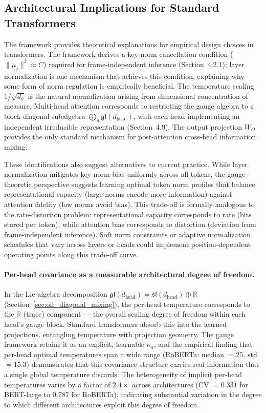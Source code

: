 \documentclass[twoside,11pt]{article}
\begin{document}
\subsection{Architectural Implications for Standard Transformers}

The framework provides theoretical explanations for empirical design choices in transformers. The framework derives a key-norm cancellation condition ($\|\mu_j\|^2 \approx C$) required for frame-independent inference (Section~4.2.1); layer normalization is one mechanism that achieves this condition, explaining why some form of norm regulation is empirically beneficial. The temperature scaling $1/\sqrt{d_k}$ is the natural normalization arising from dimensional concentration of measure. Multi-head attention corresponds to restricting the gauge algebra to a block-diagonal subalgebra $\bigoplus_a \mathfrak{gl}(d_{\mathrm{head}})$, with each head implementing an independent irreducible representation (Section~4.9). The output projection $W_O$ provides the only standard mechanism for post-attention cross-head information mixing.

These identifications also suggest alternatives to current practice. While layer normalization mitigates key-norm bias uniformly across all tokens, the gauge-theoretic perspective suggests learning optimal token norm profiles that balance representational capacity (large norms encode more information) against attention fidelity (low norms avoid bias). This trade-off is formally analogous to the rate-distortion problem: representational capacity corresponds to rate (bits stored per token), while attention bias corresponds to distortion (deviation from frame-independent inference). Soft norm constraints or adaptive normalization schedules that vary across layers or heads could implement position-dependent operating points along this trade-off curve.

\paragraph{Per-head covariance as a measurable architectural degree of freedom.}
In the Lie algebra decomposition $\mathfrak{gl}(d_{\text{head}}) = \mathfrak{sl}(d_{\text{head}}) \oplus \mathbb{R}$ (Section~\ref{sec:off_diagonal_mixing}), the per-head temperature corresponds to the $\mathbb{R}$ (trace) component --- the overall scaling degree of freedom within each head's gauge block. Standard transformers absorb this into the learned projections, entangling temperature with projection geometry. The gauge framework retains it as an explicit, learnable $\kappa_a$, and the empirical finding that per-head optimal temperatures span a wide range (RoBERTa: median $= 25$, std $= 15.3$) demonstrates that this covariance structure carries real information that a single global temperature discards. The heterogeneity of implicit per-head temperatures varies by a factor of $2.4\times$ across architectures (CV $= 0.331$ for BERT-large to $0.787$ for RoBERTa), indicating substantial variation in the degree to which different architectures exploit this degree of freedom.
\end{document}
